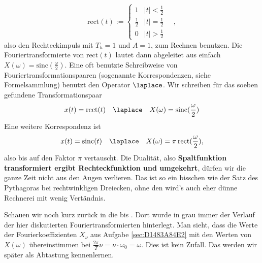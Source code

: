 \begin{Loesung}
\begin{equation}
\text{rect}(t) := \begin{cases} 1 & |t| < \frac{1}{2} \\ \frac{1}{2} & |t| = \frac{1}{2} \\ 0 & |t| > \frac{1}{2} \end{cases}\quad,
\end{equation}
also den Rechteckimpuls mit $T_h=1$ und $A=1$, zum Rechnen benutzen.
%
Die Fouriertransformierte von $\text{rect}(t)$ lautet dann abgeleitet aus
 einfach
$X(\omega) = \mathrm{sinc}(\frac{\omega}{2})$.
%
Eine oft benutzte Schreibweise von Fouriertransformationspaaren (sogenannte
Korrespondenzen, siehe Formelsammlung) benutzt den Operator $\laplace$.
%
Wir schreiben für das soeben gefundene Transformationspaar
\begin{equation}
x(t) = \text{rect}(t) \quad \laplace \quad X(\omega) = \mathrm{sinc}(\frac{\omega}{2})
\end{equation}
%
Eine weitere Korrespondenz ist
\begin{equation}
x(t) = \text{sinc}(t) \quad \laplace \quad X(\omega) = \pi \, \mathrm{rect}(\frac{\omega}{2}),
\end{equation}
also bis auf den Faktor $\pi$ vertauscht.
%
Die Dualität, also \textbf{Spaltfunktion transformiert ergibt Rechteckfunktion und umgekehrt},
dürfen wir die ganze Zeit nicht aus den Augen verlieren. Das ist so ein bisschen
wie der Satz des Pythagoras bei rechtwinkligen Dreiecken, ohne den wird's auch eher
dünne Rechnerei mit wenig Vertändnis.

Schauen wir noch kurz zurück in die  bis .
Dort wurde in grau immer der Verlauf der hier diskutierten Fouriertransformierten
hinterlegt. Man sieht, dass die Werte der Fourierkoeffizienten $X_\nu$
 aus Aufgabe \ref{sec:D1483A84E2}
mit den Werten von $X(\omega)$  übereinstimmen bei
$\frac{2\pi}{T} \nu = \nu \cdot \omega_0 = \omega$.
Dies ist kein Zufall. Das werden wir später als Abtastung kennenlernen.



\end{Loesung}

